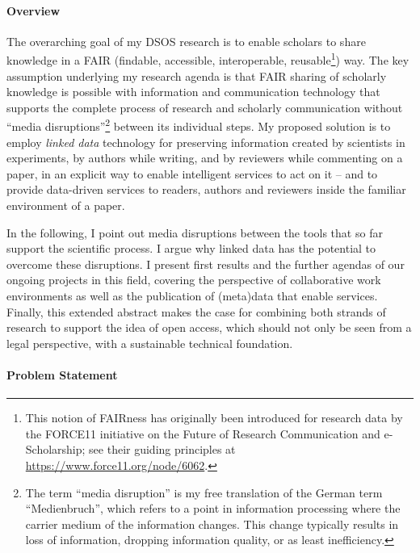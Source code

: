 \documentclass[a4paper,USenglish]{dagrep}
\begin{document}
\paragraph*{Overview}

The overarching goal of my DSOS research is to enable scholars to share
knowledge in a FAIR (findable, accessible, interoperable, reusable\footnote{%
This notion of FAIRness has originally been introduced for research data by the
FORCE11 initiative on the Future of Research Communication and e-Scholarship;
see their guiding principles at \url{https://www.force11.org/node/6062}.%
}) way.
The key assumption underlying my research agenda is that FAIR sharing of
scholarly knowledge is possible with information and communication technology
that supports the complete process of research and scholarly communication
without ``media disruptions''\footnote{%
The term ``media disruption'' is my free translation of the German term
``Medienbruch'', which refers to a point in information processing where the
carrier medium of the information changes.
This change typically results in loss of information, dropping information
quality, or as least inefficiency.%
} between its individual steps.
My proposed solution is to employ \emph{linked data} technology for preserving
information created by scientists in experiments, by authors while writing, and
by reviewers while commenting on a paper, in an explicit way to enable
intelligent services to act on it – and to provide data-driven services to
readers, authors and reviewers inside the familiar environment of a paper.

In the following, I point out media disruptions between the tools that so far
support the scientific process.
I argue why linked data has the potential to overcome these disruptions.
I present first results and the further agendas of our ongoing projects in this
field, covering the perspective of collaborative work environments as well as
the publication of (meta)data that enable services.
Finally, this extended abstract makes the case for combining both strands of
research to support the idea of open access, which should not only be seen from
a legal perspective, with a sustainable technical foundation.

\paragraph*{Problem Statement}
\end{document}
